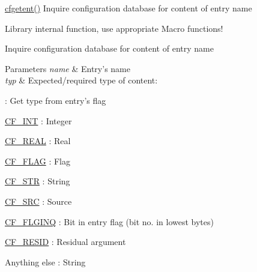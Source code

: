 \hyperlink{group__retrieval_gac13ba743ed26e6c05df14817ad9df3da}{cfgetent()} Inquire configuration database for content of entry name 

Library internal function, use appropriate Macro functions!

Inquire configuration database for content of entry name


\begin{DoxyParams}{Parameters}
{\em name} & Entry's name \\
\hline
{\em typ} & Expected/required type of content\-: \begin{DoxyItemize}
\item {} \-: Get type from entry's flag \item \hyperlink{group__special__options__mask_gab33869d596619ad14675c053925a42e0}{C\-F\-\_\-\-I\-N\-T} \-: Integer \item \hyperlink{group__special__options__mask_gaeefdbef320cbd7179f1fb0ebe0fcf5ce}{C\-F\-\_\-\-R\-E\-A\-L} \-: Real \item \hyperlink{group__special__options__mask_ga1d1f1d1b6eac6b5d9970102318ab2667}{C\-F\-\_\-\-F\-L\-A\-G} \-: Flag \item \hyperlink{group__special__options__mask_ga64c30a2865061d0c1074bc6ec91e3dcf}{C\-F\-\_\-\-S\-T\-R} \-: String \item \hyperlink{group__special__options__mask_gad9b1f659b11c529a0ed1035caf8b239b}{C\-F\-\_\-\-S\-R\-C} \-: Source \item \hyperlink{group__special__options__mask_ga36792935eec7c6636b6aea8df82f7480}{C\-F\-\_\-\-F\-L\-G\-I\-N\-Q} \-: Bit in entry flag (bit no. in lowest bytes) \item \hyperlink{group__special__options__mask_ga5415b257c706aae33d91d3947a3429c0}{C\-F\-\_\-\-R\-E\-S\-I\-D} \-: Residual argument \item Anything else \-: String\end{DoxyItemize}
\\
\hline
\end{DoxyParams}
